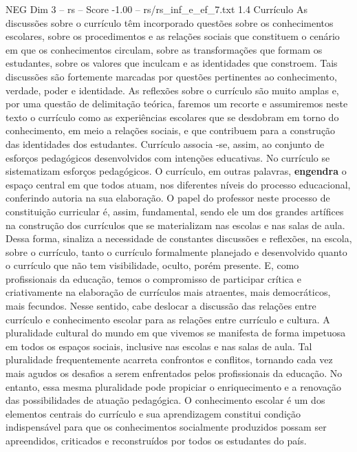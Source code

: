 \begin{textsample}{NEG Dim 3 – rs – Score -1.00 – rs/rs\_inf\_e\_ef\_7.txt}  \label{ex:f3_neg_041}
1.4 Currículo As discussões sobre o currículo têm incorporado questões sobre os conhecimentos escolares, sobre os procedimentos e as relações sociais que constituem o cenário em que os conhecimentos circulam, sobre as transformações que formam os estudantes, sobre os valores que inculcam e as identidades que constroem.
Tais discussões são fortemente marcadas por questões pertinentes ao conhecimento, verdade, poder e identidade.
As reflexões sobre o currículo são muito amplas e, por uma questão de delimitação teórica, faremos um recorte e assumiremos neste texto o currículo como as experiências escolares que se desdobram em torno do conhecimento, em meio a relações sociais, e que contribuem para a construção das identidades dos estudantes.
Currículo associa -se, assim, ao conjunto de esforços pedagógicos desenvolvidos com intenções educativas.
No currículo se sistematizam esforços pedagógicos.
O currículo, em outras palavras, \textbf{engendra} o espaço central em que todos atuam, nos diferentes níveis do processo educacional, conferindo autoria na sua elaboração.
O papel do professor neste processo de constituição curricular é, assim, fundamental, sendo ele um dos grandes artífices na construção dos currículos que se materializam nas escolas e nas salas de aula.
Dessa forma, sinaliza a necessidade de constantes discussões e reflexões, na escola, sobre o currículo, tanto o currículo formalmente planejado e desenvolvido quanto o currículo que não tem visibilidade, oculto, porém presente.
E, como profissionais da educação, temos o compromisso de participar crítica e criativamente na elaboração de currículos mais atraentes, mais democráticos, mais fecundos.
Nesse sentido, cabe deslocar a discussão das relações entre currículo e conhecimento escolar para as relações entre currículo e cultura.
A pluralidade cultural do mundo em que vivemos se manifesta de forma impetuosa em todos os espaços sociais, inclusive nas escolas e nas salas de aula.
Tal pluralidade frequentemente acarreta confrontos e conflitos, tornando cada vez mais agudos os desafios a serem enfrentados pelos profissionais da educação.
No entanto, essa mesma pluralidade pode propiciar o enriquecimento e a renovação das possibilidades de atuação pedagógica.
O conhecimento escolar é um dos elementos centrais do currículo e sua aprendizagem constitui condição indispensável para que os conhecimentos socialmente produzidos possam ser apreendidos, criticados e reconstruídos por todos os estudantes do país.

\end{textsample}
